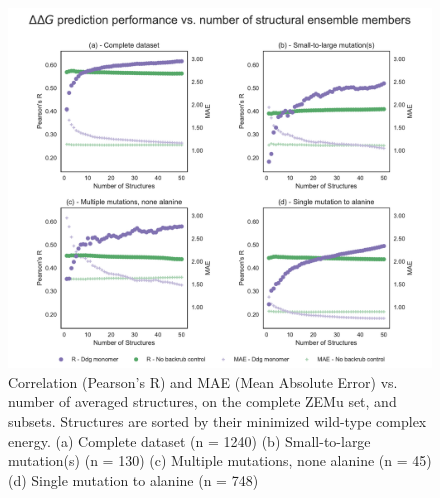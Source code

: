 \begin{figure}
  \includegraphics[width=\textwidth,keepaspectratio]{structs-v-corr-WildTypeComplex-ddg-monomer-16-003-zemu-2.pdf}
  \caption[]{ %
    Correlation (Pearson's R) and MAE (Mean Absolute Error) vs. number of averaged structures, on the complete ZEMu set, and subsets. Structures are sorted by their minimized wild-type complex energy. 
    (a) Complete dataset (n = 1240)
    (b) Small-to-large mutation(s) (n = 130)
    (c) Multiple mutations, none alanine (n = 45)
    (d) Single mutation to alanine (n = 748)
  } \label{fig:structs-v-corr-WildTypeComplex-ddg-monomer-16-003-zemu-2}
\end{figure}
